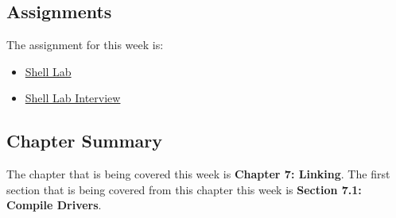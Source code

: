 \subsection{Assignments}

The assignment for this week is:

\begin{itemize}
    \item \href{https://github.com/QuantumCompiler/CU/tree/main/CSPB%202400%20-%20Computer%20Systems/CSPB%202400%20-%20Assignments/CSPB%202400%20-%20Assignment%205%20-%20Shell%20Lab}{Shell Lab} 
    \item \href{https://github.com/QuantumCompiler/CU/tree/main/CSPB%202400%20-%20Computer%20Systems/CSPB%202400%20-%20Assignments/CSPB%202400%20-%20Assignment%205%20-%20Shell%20Lab}{Shell Lab Interview} 
\end{itemize}

\subsection{Chapter Summary}

The chapter that is being covered this week is \textbf{Chapter 7: Linking}. The first section that is being covered from this chapter this week is \textbf{Section 7.1: Compile Drivers}.

